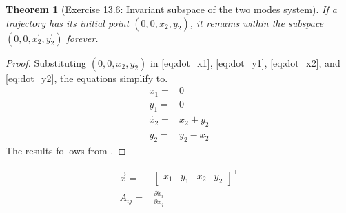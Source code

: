 \documentclass[]{article}
\newtheorem{thm}{Theorem}
\begin{document}
\begin{thm}[Exercise 13.6: Invariant subspace of the two modes system]
	If a trajectory has its initial point $(0,0,x_2,y_2)$, it remains within the subspace $(0,0,x_2^\prime,y_2^\prime)$ forever.
\end{thm}

\begin{proof}
	Substituting $(0,0,x_2,y_2)$ in \eqref{eq:dot_x1}, \eqref{eq:dot_y1}, \eqref{eq:dot_x2}, and \eqref{eq:dot_y2}, the equations simplify to.
	\begin{align*}
		\dot{x_1} =&0  \\
		\dot{y_1}=& 0 \\
		\dot{x_2} =&x_2+y_2  \\
		\dot{y_2}=& y_2-x_2
	\end{align*}
The results follows from \cite[Theorem 3]{hurewicz1958lectures}.
\end{proof}

\begin{align*}
	\vec{x}=& \begin{bmatrix}
		x_1&y_1&x_2&y_2
	\end{bmatrix}^\top\\
	A_{ij} =&\frac{\partial \dot{x}_i}{\partial x_j}
\end{align*}
\end{document}
